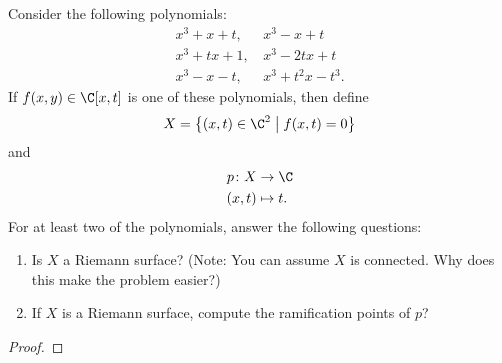 \documentclass[10pt]{amsart}
\begin{document}
\begin{thm}
    Consider the following polynomials:
    \begin{align*}
        x^3 + x + t,\, &x^3 - x + t\\
        x^3 + tx + 1,\, &x^3 - 2tx + t\\
        x^3 - x - t,\, &x^3 + t^2x - t^3.
    \end{align*}
    If $f(x,y) \in \C[x,t]$ is one of these polynomials, then define
    $$X = \left\{ (x,t) \in \C^2 \;\middle\vert\; f(x,t) = 0\right\}$$
    and
    \begin{align*}
        p \colon X &\rightarrow \C\\
        (x,t) & \mapsto t.
    \end{align*}
    For at least two of the polynomials, answer the following questions:
    \begin{enumerate}
        \item
	Is $X$ a Riemann surface?
	(Note: You can assume $X$ is connected.  Why does this make the problem easier?)
        \item
	If $X$ is a Riemann surface, compute the ramification points of $p$?
    \end{enumerate}

    \begin{proof}
    \end{proof}
\end{thm}
\end{document}
